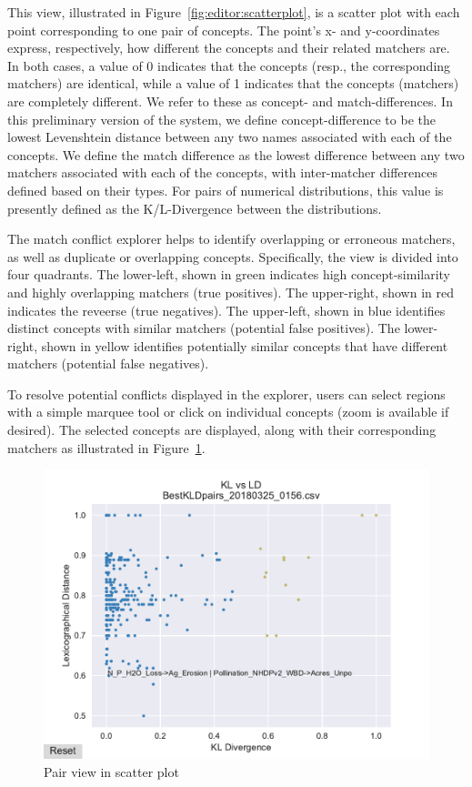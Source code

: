 This view, illustrated in Figure~\ref{fig:editor:scatterplot}, is a scatter plot with each point corresponding to one pair of concepts.
The point's x- and y-coordinates express, respectively, how different the concepts and their related matchers are.
In both cases, a value of 0 indicates that the concepts (resp., the corresponding matchers) are identical, while a value of 1 indicates that the concepts (matchers) are completely different.
We refer to these as concept- and match-differences.
In this preliminary version of the system, we define concept-difference to be the lowest Levenshtein distance between any two names associated with each of the concepts.
We define the match difference as the lowest difference between any two matchers associated with each of the concepts, with inter-matcher differences defined based on their types.
For pairs of numerical distributions, this value is presently defined as the K/L-Divergence between the distributions.

The match conflict explorer helps to identify overlapping or erroneous matchers, as well as duplicate or overlapping concepts.
Specifically, the view is divided into four quadrants.  The lower-left, shown in green indicates high concept-similarity and highly overlapping matchers (true positives).  
The upper-right, shown in red indicates the reveerse (true negatives).
The upper-left, shown in blue identifies distinct concepts with similar matchers (potential false positives).  
The lower-right, shown in yellow identifies potentially similar concepts that have different matchers (potential false negatives).

To resolve potential conflicts displayed in the explorer, users can select regions with a simple marquee tool or click on individual concepts (zoom is available if desired).
The selected concepts are displayed, along with their corresponding matchers as illustrated in Figure~\ref{fig:pairview}.

\begin{figure}
	\centering
	\includegraphics[trim={0 0 0 15mm},clip,width=\columnwidth]{graphics/Pair_view_data_callouts}
	\caption{Pair view in scatter plot}
	\label{fig:pairview}
	\trimfigurespacing
\end{figure}


